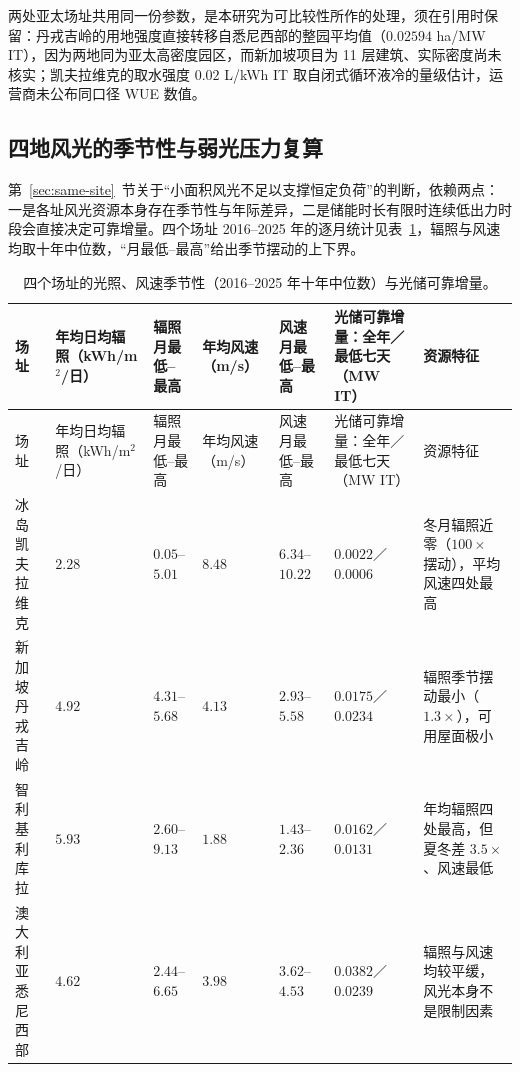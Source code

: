 两处亚太场址共用同一份参数，是本研究为可比较性所作的处理，须在引用时保留：丹戎吉岭的用地强度直接转移自悉尼西部的整园平均值（$0.02594$ ha/MW IT），因为两地同为亚太高密度园区，而新加坡项目为 11 层建筑、实际密度尚未核实；凯夫拉维克的取水强度 $0.02$ L/kWh IT 取自闭式循环液冷的量级估计，运营商未公布同口径 WUE 数值。

\subsection{四地风光的季节性与弱光压力复算}\label{apx:f3}

第~\ref{sec:same-site}~节关于“小面积风光不足以支撑恒定负荷”的判断，依赖两点：一是各址风光资源本身存在季节性与年际差异，二是储能时长有限时连续低出力时段会直接决定可靠增量。四个场址 2016–2025 年的逐月统计见表~\ref{tab:seasons}，辐照与风速均取十年中位数，“月最低–最高”给出季节摆动的上下界。

{\footnotesize\setlength{\tabcolsep}{3pt}%
\begin{longtable}{@{}>{\raggedright\arraybackslash}p{}>{\raggedright\arraybackslash}p{}>{\raggedright\arraybackslash}p{}>{\raggedright\arraybackslash}p{}>{\raggedright\arraybackslash}p{}>{\raggedright\arraybackslash}p{}>{\raggedright\arraybackslash}p{}@{}}
\caption{四个场址的光照、风速季节性（2016–2025 年十年中位数）与光储可靠增量。}\label{tab:seasons}\\
\toprule
场址 & 年均日均辐照（kWh/m$^2$/日） & 辐照月最低–最高 & 年均风速（m/s） & 风速月最低–最高 & 光储可靠增量：全年／最低七天（MW IT） & 资源特征 \\
\midrule
\endfirsthead
\toprule
场址 & 年均日均辐照（kWh/m$^2$/日） & 辐照月最低–最高 & 年均风速（m/s） & 风速月最低–最高 & 光储可靠增量：全年／最低七天（MW IT） & 资源特征 \\
\midrule
\endhead
\bottomrule
\endlastfoot
冰岛凯夫拉维克 & $2.28$ & $0.05$–$5.01$ & $8.48$ & $6.34$–$10.22$ & $0.0022$／$0.0006$ & 冬月辐照近零（$100\times$ 摆动），平均风速四处最高 \\
新加坡丹戎吉岭 & $4.92$ & $4.31$–$5.68$ & $4.13$ & $2.93$–$5.58$ & $0.0175$／$0.0234$ & 辐照季节摆动最小（$1.3\times$），可用屋面极小 \\
智利基利库拉 & $5.93$ & $2.60$–$9.13$ & $1.88$ & $1.43$–$2.36$ & $0.0162$／$0.0131$ & 年均辐照四处最高，但夏冬差 $3.5\times$、风速最低 \\
澳大利亚悉尼西部 & $4.62$ & $2.44$–$6.65$ & $3.98$ & $3.62$–$4.53$ & $0.0382$／$0.0239$ & 辐照与风速均较平缓，风光本身不是限制因素 \\
\end{longtable}
}


